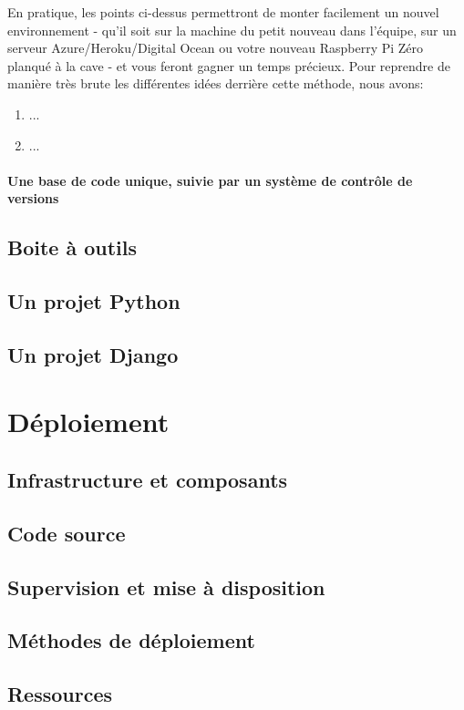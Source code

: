 \documentclass[a4paper,12pt]{book}
\begin{document}
En pratique, les points ci-dessus permettront de monter facilement un nouvel environnement - qu’il soit sur la machine du petit nouveau dans l’équipe, sur un serveur Azure/Heroku/Digital Ocean ou votre nouveau Raspberry Pi Zéro planqué à la cave - et vous feront gagner un temps précieux. Pour reprendre de manière très brute les différentes idées derrière cette méthode, nous avons:

\begin{enumerate}
	\item ...
	\item ...
\end{enumerate}

\subsection{Une base de code unique, suivie par un système de contrôle de versions}

\chapter{Boite à outils}
\chapter{Un projet Python}
\chapter{Un projet Django}


\part{Déploiement}
\chapter{Infrastructure et composants}
\chapter{Code source}
\chapter{Supervision et mise à disposition}
\chapter{Méthodes de déploiement}
\chapter{Ressources}
\end{document}
